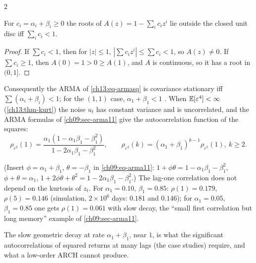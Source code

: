 \begin{paracol}{2}
\begin{secondary}
\begin{lemma}\label{ch13:lem-roots}
For $c_i=\alpha_i+\beta_i\ge0$ the roots of $A(z)=1-\sum_ic_iz^i$ lie outside the closed unit disc iff $\sum_ic_i<1$.
\end{lemma}
\begin{proof}
If $\sum c_i<1$, then for $|z|\le1$, $|\sum c_iz^i|\le\sum c_i<1$, so $A(z)\ne0$. If $\sum c_i\ge1$, then $A(0)=1>0\ge A(1)$, and $A$ is continuous, so it has a root in $(0,1]$.
\end{proof}
\end{secondary}
Consequently the ARMA of \eqref{ch13:eq-armasq} is covariance stationary iff $\sum(\alpha_i+\beta_i)<1$; for the $(1,1)$ case, $\alpha_1+\beta_1<1$
. When $\mathbb{E}[\varepsilon^4]<\infty$ (\cref{ch13:thm-kurt}) the noise $u_t$ has constant variance and is uncorrelated, and the ARMA formulas of
\cref{ch09:sec-arma11} give the autocorrelation function of the squares:
\begin{equation}\label{ch13:eq-acfsq}
  \rho_{\varepsilon^2}(1)=\frac{\alpha_1(1-\alpha_1\beta_1-\beta_1^2)}{1-2\alpha_1\beta_1-\beta_1^2},\qquad
  \rho_{\varepsilon^2}(k)=(\alpha_1+\beta_1)^{k-1}\rho_{\varepsilon^2}(1),\ k\ge2 .
\end{equation}
\begin{secondary}
(Insert $\phi=\alpha_1+\beta_1$, $\theta=-\beta_1$ in \cref{ch09:eq-arma11}: $1+\phi\theta=1-\alpha_1\beta_1-\beta_1^2$, $\phi+\theta=\alpha_1$, $1+2\phi\theta+\theta^2=1-2\alpha_1\beta_1-\beta_1^2$.) The lag-one
correlation does not depend on the kurtosis of $z_t$. For $\alpha_1=0.10$, $\beta_1=0.85$: $\rho(1)=0.179$, $\rho(5)=0.146$ (simulation, $2\times10^6$ days: $0.181$ and
$0.146$); for $\alpha_1=0.05$, $\beta_1=0.85$ one gets $\rho(1)=0.061$ with slow decay, the ``small first correlation but long memory'' example of \cref{ch09:sec-arma11}.
\end{secondary}
The slow geometric decay at rate $\alpha_1+\beta_1$, near $1$, is what the significant autocorrelations of squared returns at many lags (the case studies) require, and what a low-order ARCH
cannot produce.


\end{paracol}
